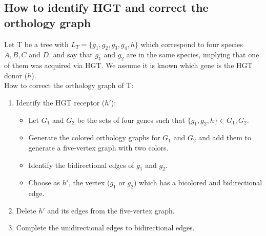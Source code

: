 \documentclass[10pt,a4paper,notitlepage]{article}
\begin{document}
\subsection{How to identify HGT and correct the orthology graph}
	Let T be a tree with $L_T=\{ g_1, g_2, g_3, g_4, h\}$ which correspond to four species $A, B, C$ and $D$, and say that $g_1$ and $g_2$ are in the same species, implying that one of them was acquired via HGT. We assume it is known which gene is the HGT donor ($h$). 
	\\
	How to correct the orthology graph of T:
	\begin{enumerate}
		\item Identify the HGT receptor ($h'$):
			\begin{itemize}
				\item Let $G_1$ and $G_2$ be the sets of four genes such that $\{g_1, g_2, h\} \in G_1,G_2$.
				\item Generate the colored orthology graphs for $G_1$ and $G_2$ and add them to generate a five-vertex graph with two colors.
				\item Identify the bidirectional edges of $g_1$ and $g_2$.
				\item Choose as $h'$, the vertex ($g_1$ or  $g_2$) which has a bicolored and bidirectional edge.
			\end{itemize}
		\item Delete $h'$ and its edges from the five-vertex graph.
		\item Complete the unidirectional edges to bidirectional edges. 
	\end{enumerate}
	
\end{document}
